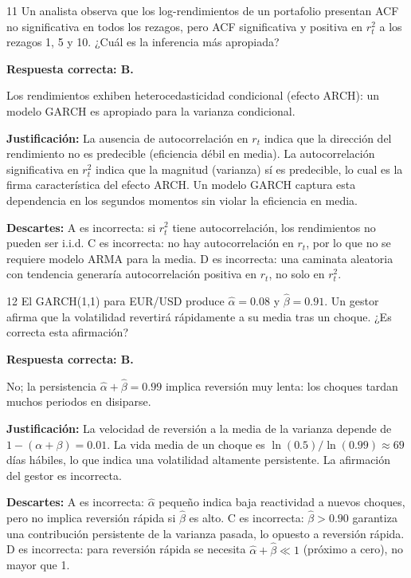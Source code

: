 \documentclass[11pt,a4paper]{article}
\begin{document}
\begin{cajaCFA}{11}
Un analista observa que los log-rendimientos de un portafolio presentan ACF no significativa en todos los rezagos, pero ACF significativa y positiva en $r_t^2$ a los rezagos 1, 5 y 10. ¿Cuál es la inferencia más apropiada?
\end{cajaCFA}

\textbf{Respuesta correcta: B.}

Los rendimientos exhiben heterocedasticidad condicional (efecto ARCH): un modelo GARCH es apropiado para la varianza condicional.

\textbf{Justificación:} La ausencia de autocorrelación en $r_t$ indica que la dirección del rendimiento no es predecible (eficiencia débil en media). La autocorrelación significativa en $r_t^2$ indica que la magnitud (varianza) sí es predecible, lo cual es la firma característica del efecto ARCH. Un modelo GARCH captura esta dependencia en los segundos momentos sin violar la eficiencia en media.

\textbf{Descartes:} A es incorrecta: si $r_t^2$ tiene autocorrelación, los rendimientos no pueden ser i.i.d. C es incorrecta: no hay autocorrelación en $r_t$, por lo que no se requiere modelo ARMA para la media. D es incorrecta: una caminata aleatoria con tendencia generaría autocorrelación positiva en $r_t$, no solo en $r_t^2$.

\begin{cajaCFA}{12}
El GARCH(1,1) para EUR/USD produce $\hat{\alpha}=0.08$ y $\hat{\beta}=0.91$. Un gestor afirma que la volatilidad revertirá rápidamente a su media tras un choque. ¿Es correcta esta afirmación?
\end{cajaCFA}

\textbf{Respuesta correcta: B.}

No; la persistencia $\hat{\alpha}+\hat{\beta}=0.99$ implica reversión muy lenta: los choques tardan muchos periodos en disiparse.

\textbf{Justificación:} La velocidad de reversión a la media de la varianza depende de $1-(\alpha+\beta)=0.01$. La vida media de un choque es $\ln(0.5)/\ln(0.99)\approx 69$ días hábiles, lo que indica una volatilidad altamente persistente. La afirmación del gestor es incorrecta.

\textbf{Descartes:} A es incorrecta: $\hat{\alpha}$ pequeño indica baja reactividad a nuevos choques, pero no implica reversión rápida si $\hat{\beta}$ es alto. C es incorrecta: $\hat{\beta}>0.90$ garantiza una contribución persistente de la varianza pasada, lo opuesto a reversión rápida. D es incorrecta: para reversión rápida se necesita $\hat{\alpha}+\hat{\beta}\ll 1$ (próximo a cero), no mayor que 1.
\end{document}
